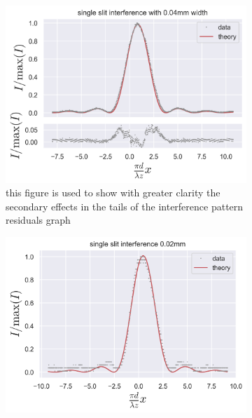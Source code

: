 \begin{figure}[H]
\begin{subfigure}{0.48\columnwidth}
        \centering
        \includegraphics[width=\columnwidth]{figures/single slit interference with 0.04mm not best fit but better tails.png}
        \caption{this figure is used to show with greater clarity the secondary effects in the tails of the interference pattern residuals graph}
        \label{fig:single slit interference with 0.04mm not best fit but better tails}
    \end{subfigure}
    \begin{subfigure}{0.5\columnwidth}
        \centering
        \includegraphics[width=\columnwidth]{figures/single slit interference 0.02mm.png}
        \caption{}
        \label{fig:single slit interference 0.02mm}
    \end{subfigure}
    \label{fig:single slit examples}
\end{figure}
